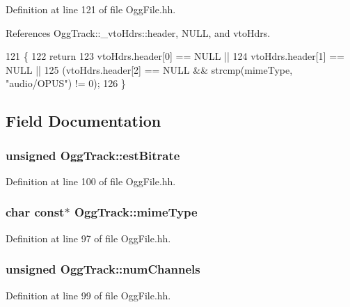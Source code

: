 Definition at line 121 of file Ogg\+File.\+hh.



References Ogg\+Track\+::\+\_\+vto\+Hdrs\+::header, N\+U\+L\+L, and vto\+Hdrs.


\begin{DoxyCode}
121                                 \{
122     \textcolor{keywordflow}{return}
123       vtoHdrs.header[0] == NULL ||
124       vtoHdrs.header[1] == NULL ||
125       (vtoHdrs.header[2] == NULL && strcmp(mimeType, \textcolor{stringliteral}{"audio/OPUS"}) != 0);
126     \}
\end{DoxyCode}


\subsection{Field Documentation}
\subsubsection[{est\+Bitrate}]{\setlength{\rightskip}{0pt plus 5cm}unsigned Ogg\+Track\+::est\+Bitrate}\label{classOggTrack_afc509e3351117fcea71bbd79fea4fcb3}


Definition at line 100 of file Ogg\+File.\+hh.

\subsubsection[{mime\+Type}]{\setlength{\rightskip}{0pt plus 5cm}char const$\ast$ Ogg\+Track\+::mime\+Type}\label{classOggTrack_ac4b1ad73cb4c387914e0127f4d3d76f4}


Definition at line 97 of file Ogg\+File.\+hh.

\subsubsection[{num\+Channels}]{\setlength{\rightskip}{0pt plus 5cm}unsigned Ogg\+Track\+::num\+Channels}\label{classOggTrack_a931235db3ec4cad6eb740e25eab152b9}


Definition at line 99 of file Ogg\+File.\+hh.

